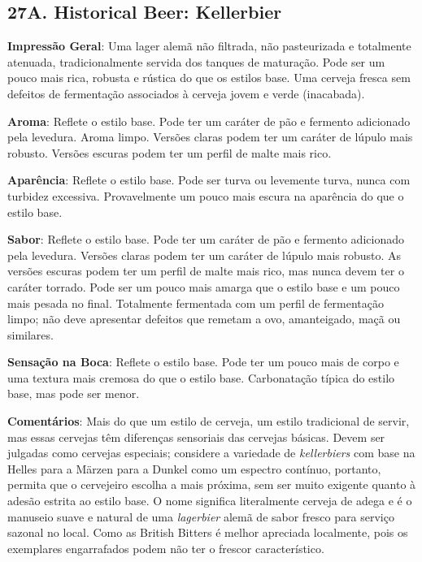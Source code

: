 \subsection*{27A. Historical Beer: Kellerbier}
\textbf{Impressão Geral}: Uma lager alemã não filtrada, não pasteurizada e totalmente atenuada, tradicionalmente servida dos tanques de maturação. Pode ser um pouco mais rica, robusta e rústica do que os estilos base. Uma cerveja fresca sem defeitos de fermentação associados à cerveja jovem e verde (inacabada).

\textbf{Aroma}: Reflete o estilo base. Pode ter um caráter de pão e fermento adicionado pela levedura. Aroma limpo. Versões claras podem ter um caráter de lúpulo mais robusto. Versões escuras podem ter um perfil de malte mais rico.

\textbf{Aparência}: Reflete o estilo base. Pode ser turva ou levemente turva, nunca com turbidez excessiva. Provavelmente um pouco mais escura na aparência do que o estilo base.

\textbf{Sabor}: Reflete o estilo base. Pode ter um caráter de pão e fermento adicionado pela levedura. Versões claras podem ter um caráter de lúpulo mais robusto. As versões escuras podem ter um perfil de malte mais rico, mas nunca devem ter o caráter torrado. Pode ser um pouco mais amarga que o estilo base e um pouco mais pesada no final. Totalmente fermentada com um perfil de fermentação limpo; não deve apresentar defeitos que remetam a ovo, amanteigado, maçã ou similares.

\textbf{Sensação na Boca}: Reflete o estilo base. Pode ter um pouco mais de corpo e uma textura mais cremosa do que o estilo base. Carbonatação típica do estilo base, mas pode ser menor.

\textbf{Comentários}: Mais do que um estilo de cerveja, um estilo tradicional de servir, mas essas cervejas têm diferenças sensoriais das cervejas básicas. Devem ser julgadas como cervejas especiais; considere a variedade de \textit{kellerbiers} com base na Helles para a Märzen para a Dunkel como um espectro contínuo, portanto, permita que o cervejeiro escolha a mais próxima, sem ser muito exigente quanto à adesão estrita ao estilo base. O nome significa literalmente cerveja de adega e é o manuseio suave e natural de uma \textit{lagerbier} alemã de sabor fresco para serviço sazonal no local. Como as British Bitters é melhor apreciada localmente, pois os exemplares engarrafados podem não ter o frescor característico.

